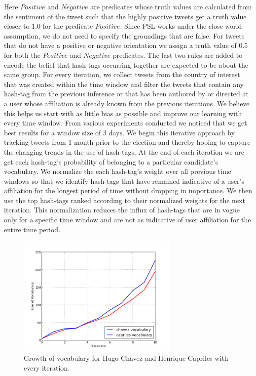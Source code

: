 Here $Positive$ and $Negative$ are predicates whose truth values are calculated from the sentiment of the tweet such that the highly positive tweets get a truth value closer to $1.0$ for the predicate $Positive$. 
Since PSL works under the close world assumption, we do not need to specify the groundings that are false.
For tweets that do not have a positive or negative orientation we assign a truth value of $0.5$ for both the $Positive$ and $Negative$ predicates.
The last two rules are added to encode the belief that hash-tags occurring together are expected to be about the same group.
For every iteration, we collect tweets from the country of interest that was created within the time window and filter the tweets that contain any hash-tag from the previous inference  or that has been authored by or directed at a user whose affiliation is already known from the previous iterations.
We believe this helps us start with as little bias as possible and improve our learning with every time window.
From various experiments conducted we noticed that we get best results for a window size of 3 days. 
We begin this iterative approach by tracking tweets from 1 month prior to the election and thereby hoping to capture the changing trends in the use of hash-tags.
At the end of each iteration we are get each hash-tag's probability of belonging to a particular candidate's vocabulary. 
We normalize the each hash-tag's weight over all previous time windows so that we identify hash-tags that have remained indicative of a user's affiliation for the longest period of time without dropping in importance. 
We then use the top hash-tags ranked according to their normalized weights  for the next iteration.
This normalization reduces the influx of hash-tags that are in vogue only for a specific time window and are not as indicative of user affiliation for the entire time period. 
\newline
\begin{figure}
	\centering
	\includegraphics[width=0.7\textwidth, height=0.3\textheight]{support_files/WordGrowth.png}
	\vspace{-1em}
	\caption{Growth of vocabulary for Hugo Chavez and Henrique Capriles with every iteration.}
	\label{fig:wordgrowth}
	\vspace{-1em}
\end{figure}

